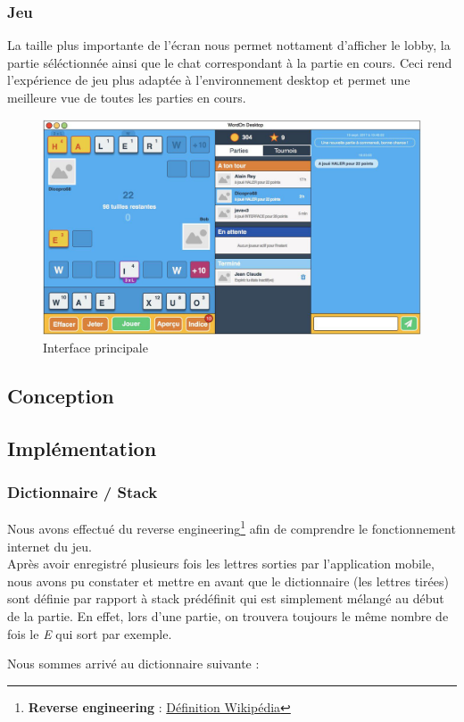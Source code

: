\documentclass[a4paper,12pt]{article}
\begin{document}
		\subsubsection{Jeu}
		La taille plus importante de l'écran nous permet nottament d'afficher le lobby, la partie séléctionnée ainsi que le chat correspondant à la partie en cours. Ceci rend l'expérience de jeu plus adaptée à l'environnement desktop et permet une meilleure vue de toutes les parties en cours.
		
		\begin{figure}[h]
			\centering
			\includegraphics[width=0.6\linewidth]{img/main.jpg}
			\caption{Interface principale}
		\end{figure}
		
	\subsection{Conception}
	
	\subsection{Implémentation}
		\subsubsection{Dictionnaire / Stack}
		Nous avons effectué du reverse engineering\footnote{\textbf{Reverse engineering} :  \href{https://fr.wikipedia.org/wiki/R\%C3\%A9tro-ing\%C3\%A9nierie}{Définition Wikipédia}} afin de comprendre le fonctionnement internet du jeu.\\
		Après avoir enregistré plusieurs fois les lettres sorties par l'application mobile, nous avons pu constater et mettre en avant que le dictionnaire (les lettres tirées) sont définie par rapport à stack prédéfinit qui est simplement mélangé au début de la partie. En effet, lors d'une partie, on trouvera toujours le même nombre de fois le \textit{E} qui sort par exemple.
		
		Nous sommes arrivé au dictionnaire suivante : 
		
\end{document}
